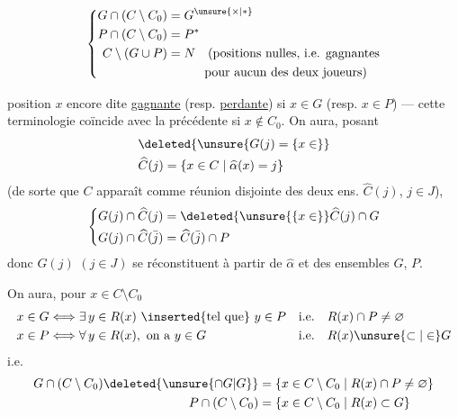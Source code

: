 \[
\left\{\begin{aligned}
G\cap(C\setminus C_0)&=G^{\unsure{\times|\ast}}\\
P\cap(C\setminus C_0)&=P^{\ast}\\
C\setminus(G\cup P)&=N\quad\text{(positions nulles, i.e. gagnantes}\\
&\hphantom{=N\quad}\text{pour aucun des deux joueurs)}
\end{aligned}\right.
\]

 position $x$  encore dite \uline{gagnante} (resp. \uline{perdante}) si $x\in G$ (resp. $x\in P$) — cette terminologie coïncide avec la précédente si $x\notin C_0$. On aura, posant
\[
\begin{aligned}
&\deleted{\unsure{G(j)=\{x\in}}\\
&\widehat C(j)=\{x\in C\mid\widehat\alpha(x)=j\}
\end{aligned}
\]
(de sorte que $C$ apparaît comme réunion disjointe des deux ens. $\widehat C(j)$, $j\in J$),
\[
\left\{\begin{aligned}
G(j)\cap\widehat C(j)&=\deleted{\unsure{\{x\in}}\widehat C(j)\cap G\\
G(j)\cap\widehat C(\bar j)&=\widehat C(\bar j)\cap P
\end{aligned}\right.
\]
donc  $G(j)$ $(j\in J)$ se réconstituent à partir de $\widehat\alpha$ et des ensembles $G$, $P$.

On aura, pour $x\in C\setminus C_0$
\[
\begin{aligned}
x\in G&\Longleftrightarrow\exists\, y\in R(x)\ \inserted{\text{tel que}}\ y\in P
&&\text{i.e.}\quad R(x)\cap P\ne\varnothing\\
x\in P&\Longleftrightarrow\forall\, y\in R(x),\ \text{on a}\ y\in G
&&\text{i.e.}\quad R(x)\unsure{\subset|\in}G
\end{aligned}
\]
i.e.
\[
\begin{aligned}
G\cap(C\setminus C_0)\deleted{\unsure{\cap G|G}}&=\{x\in C\setminus C_0\mid R(x)\cap P\ne\varnothing\}\\
P\cap(C\setminus C_0)&=\{x\in C\setminus C_0\mid R(x)\subset G\}
\end{aligned}
\]

